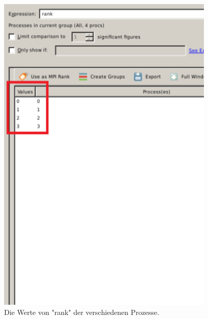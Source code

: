 \documentclass[12pt]{article}
\begin{document}
\begin{sloppypar}
\begin{figure}[htbp]
\begin{minipage}[t]{0.45\textwidth}
        \includegraphics[width=\textwidth]{res/ddt-view-rank.PNG}
        \caption*{Die Werte von "rank" der verschiedenen Prozesse.}
    \end{minipage}
\end{figure}



\end{sloppypar}
\end{document}

